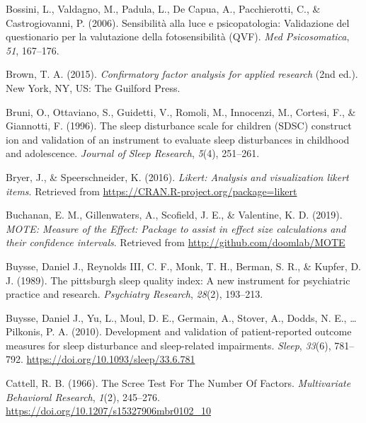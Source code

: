 \documentclass[
  english,
  man]{apa6}
\newlength{\cslhangindent}
\newlength{\cslentryspacingunit} %
\newenvironment{CSLReferences}[2] %
 {%
  \setlength{\parindent}{0pt}
  \ifodd #1
  \let\oldpar\par
  \def\par{\hangindent=\cslhangindent\oldpar}
  \fi
  \setlength{\parskip}{#2\cslentryspacingunit}
 }%
 {}
\begin{document}
\begin{CSLReferences}{1}{0}
\leavevmode{}%
Bossini, L., Valdagno, M., Padula, L., De Capua, A., Pacchierotti, C., \& Castrogiovanni, P. (2006). Sensibilit{à} alla luce e psicopatologia: Validazione del questionario per la valutazione della fotosensibilit{à} (QVF). \emph{Med Psicosomatica}, \emph{51}, 167--176.

\leavevmode{}%
Brown, T. A. (2015). \emph{Confirmatory factor analysis for applied research} (2nd ed.). {New York, NY, US}: {The Guilford Press}.

\leavevmode{}%
Bruni, O., Ottaviano, S., Guidetti, V., Romoli, M., Innocenzi, M., Cortesi, F., \& Giannotti, F. (1996). The sleep disturbance scale for children (SDSC) construct ion and validation of an instrument to evaluate sleep disturbances in childhood and adolescence. \emph{Journal of Sleep Research}, \emph{5}(4), 251--261.

\leavevmode{}%
Bryer, J., \& Speerschneider, K. (2016). \emph{Likert: Analysis and visualization likert items}. Retrieved from \url{https://CRAN.R-project.org/package=likert}

\leavevmode{}%
Buchanan, E. M., Gillenwaters, A., Scofield, J. E., \& Valentine, K. D. (2019). \emph{{MOTE: Measure of the Effect}: Package to assist in effect size calculations and their confidence intervals}. Retrieved from \url{http://github.com/doomlab/MOTE}

\leavevmode{}%
Buysse, Daniel J., Reynolds III, C. F., Monk, T. H., Berman, S. R., \& Kupfer, D. J. (1989). The pittsburgh sleep quality index: A new instrument for psychiatric practice and research. \emph{Psychiatry Research}, \emph{28}(2), 193--213.

\leavevmode{}%
Buysse, Daniel J., Yu, L., Moul, D. E., Germain, A., Stover, A., Dodds, N. E., \ldots{} Pilkonis, P. A. (2010). Development and validation of patient-reported outcome measures for sleep disturbance and sleep-related impairments. \emph{Sleep}, \emph{33}(6), 781--792. \url{https://doi.org/10.1093/sleep/33.6.781}

\leavevmode{}%
Cattell, R. B. (1966). The {Scree Test For The Number Of Factors}. \emph{Multivariate Behavioral Research}, \emph{1}(2), 245--276. \url{https://doi.org/10.1207/s15327906mbr0102_10}


\end{CSLReferences}
\end{document}
